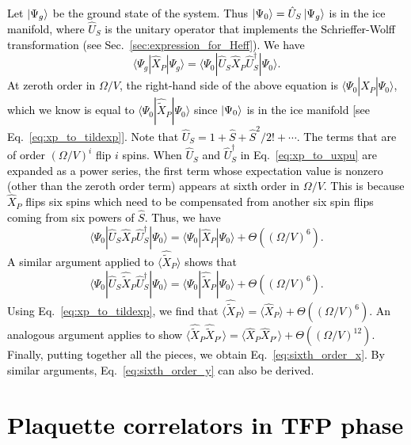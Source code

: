 \documentclass[twocolumn,superscriptaddress,amsmath,amssymb,aps,prx,nofootinbib]{revtex4-2}
\newcommand{\newtext}[1]{\textcolor{black}{#1}}
\begin{document}
\newtext{Let $\ket{\Psi_g}$ be the ground state of the system. Thus $\ket{\Psi_0} = \hat{U}_S \ket{\Psi_g}$ is in the ice manifold, where $\hat{U}_S$ is the unitary operator that implements the Schrieffer-Wolff transformation (see Sec.~\ref{sec:expression_for_Heff}).  
We have
\begin{equation}
\label{eq:xp_to_uxpu}
    \langle \Psi_g | \hat{X}_P  | \Psi_g\rangle =     \langle \Psi_0 | \hat{U}_S \hat{X}_P \hat{U}_S^\dagger| \Psi_0\rangle.
\end{equation}
At zeroth order in $\Omega/V$, the right-hand side of the above equation is $\langle \Psi_0 |  \hat{X}_P | \Psi_0\rangle$, which we know is equal to $ \langle \Psi_0 |\hat{\tilde{X}}_P |\Psi_0 \rangle$ since $\ket{\Psi_0}$ is in the ice manifold [see Eq.~\eqref{eq:xp_to_tildexp}]. 
Note that $\hat{U}_S = 1+\hat{S} + \hat{S}^2/2!+ \cdots$. The terms that are of order $(\Omega/V)^i$ flip $i$ spins.
When $\hat{U}_S$ and $\hat{U}_S^\dagger$ in Eq.~\eqref{eq:xp_to_uxpu} are expanded as a power series, the first term whose expectation value is nonzero (other than the zeroth order term) appears at sixth order in $\Omega/V$.
This is because $\hat{X}_P $ flips six spins which need to be compensated from another six spin flips coming from six powers of $\hat{S}$.
Thus, we have 
\begin{equation}
    \langle\Psi_0 | \hat{U}_S \hat{X}_P \hat{U}_S^\dagger| \Psi_0\rangle = \langle\Psi_0 |  \hat{X}_P | \Psi_0\rangle + \Theta \left((\Omega/V)^6\right).
\end{equation}
A similar argument applied to $ \langle \hat{\tilde{X}}_P \rangle$ shows that 
\begin{equation}
    \langle\Psi_0 | \hat{U}_S \hat{\tilde{X}}_P \hat{U}_S^\dagger| \Psi_0\rangle = \langle\Psi_0 |  \hat{\tilde{X}}_P | \Psi_0\rangle + \Theta \left((\Omega/V)^6\right).
\end{equation}
Using Eq.~\eqref{eq:xp_to_tildexp}, we find that $ \langle  \hat{\tilde{X}}_P \rangle = \langle  \hat{X}_P \rangle + \Theta \left((\Omega/V)^6\right)$. 
An analogous argument applies to show  $ \langle  \hat{\tilde{X}}_P \hat{\tilde{X}}_{P'}\rangle = \langle  \hat{X}_P\hat{X}_{P'} \rangle + \Theta \left((\Omega/V)^{12}\right)$. Finally, putting together all the pieces, we obtain Eq.~\eqref{eq:sixth_order_x}. 
By similar arguments, Eq.~\eqref{eq:sixth_order_y} can also be derived.}

\section{\newtext{Plaquette correlators in TFP phase}}
\label{app:plaquette_TFP}
\end{document}
